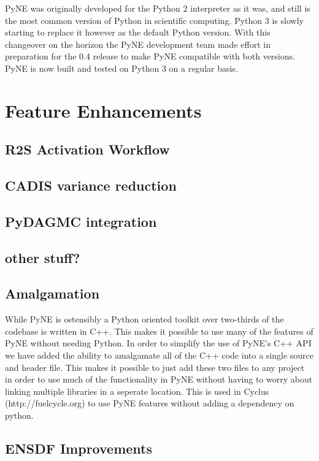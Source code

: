 \documentclass{anstrans}
\begin{document}
PyNE was originally developed for the Python 2 interpreter as it was, and still is the most common version of Python in scientific computing. Python 3 is slowly starting to replace it however as the default Python version. With this changeover on the horizon the PyNE development team made effort in preparation for the 0.4 release to make PyNE compatible with both versions. PyNE is now built and tested on Python 3 on a regular basis.

\section{Feature Enhancements}

\subsection{R2S Activation Workflow}

\subsection{CADIS variance reduction}

\subsection{PyDAGMC integration}

\subsection{other stuff?}

\subsection{Amalgamation}

While PyNE is ostensibly a Python oriented toolkit over two-thirds of the codebase is written in C++. This makes it possible to use many of the features of PyNE without needing Python. In order to simplify the use of PyNE's C++ API we have added the ability to amalgamate all of the C++ code into a single source and header file. This makes it possible to just add these two files to any project in order to use much of the functionality in PyNE without having to worry about linking multiple libraries in a seperate location. This is used in Cyclus (http://fuelcycle.org) to use PyNE features without adding a dependency on python.

\subsection{ENSDF Improvements}
\end{document}
